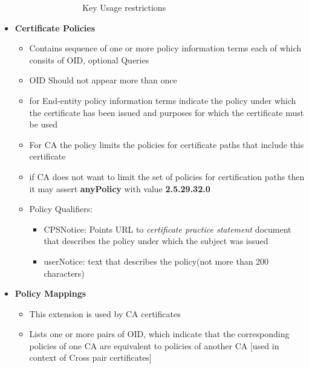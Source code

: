 \documentclass[12pt]{report}
\begin{document}
\begin{itemize}
\begin{itemize}
\begin{itemize}
\begin{itemize}
\begin{figure}[ht!]
                                    \caption{Key Usage restrictions}
                                \end{figure}
                            \end{itemize}
                    \end{itemize}
                \end{itemize}
            \item \textbf{Certificate Policies}
                \begin{itemize}
                    \item Contains sequence of one or more policy information terms each of which consits of
                        OID, optional Queries
                    \item OID Should not appear more than once
                    \item for End-entity policy information terms indicate the policy under which the certificate
                        has been issued and purposes for which the certificate must be used
                    \item For CA the policy limits the policies for certificate paths that include this certificate
                    \item if CA does not want to limit the set of policies for certification paths then it may assert
                        \textbf{anyPolicy} with value \textbf{2.5.29.32.0}
                    \item Policy Qualifiers:
                        \begin{itemize}
                            \item CPSNotice: Points URL to \textit{certificate practice statement} document that describes
                                the policy under which the subject was issued
                            \item userNotice: text that describes the policy(not more than 200 characters)
                        \end{itemize}
                \end{itemize}
            \item \textbf{Policy Mappings}
                \begin{itemize}
                    \item This extension is used by CA certificates 
                    \item Lists one or more pairs of OID, which indicate that the corresponding policies 
                        of one CA are equivalent to policies of another CA [used in context of Cross pair certificates]

\end{itemize}
\end{itemize}
\end{document}
